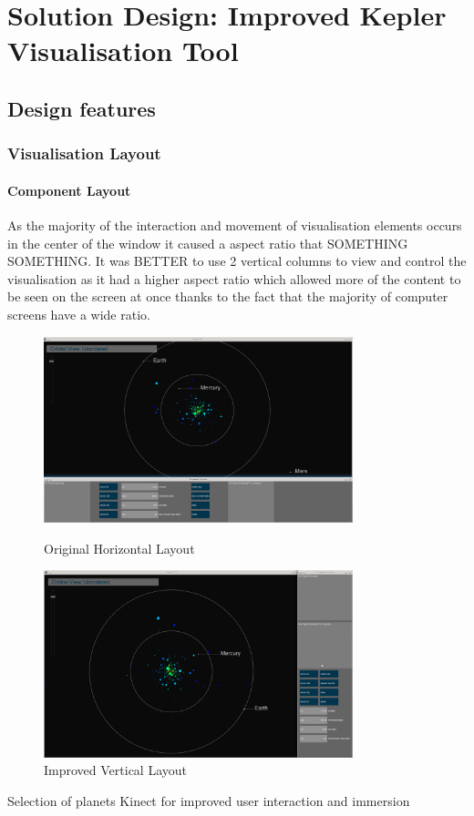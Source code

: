 \chapter{Solution Design: Improved Kepler Visualisation Tool}\label{C:sd}

\section{Design features}
\subsection{Visualisation Layout}
\subsubsection{Component Layout}
As the majority of the interaction and movement of visualisation elements occurs in the center of the window it caused a aspect ratio that SOMETHING SOMETHING. It was BETTER to use 2 vertical columns to view and control the visualisation as it had a higher aspect ratio which allowed more of the content to be seen on the screen at once thanks to the fact that the majority of computer screens have a wide ratio.

\begin{figure}[h!]
  \centering
      \includegraphics[width=0.8\textwidth]{images/layout_horizontal.jpg}
  \caption{Original Horizontal Layout}  
        \includegraphics[width=0.8\textwidth]{images/layout_vertical.jpg}
  \caption{Improved Vertical Layout}
\end{figure}

Selection of planets
Kinect for improved user interaction and immersion